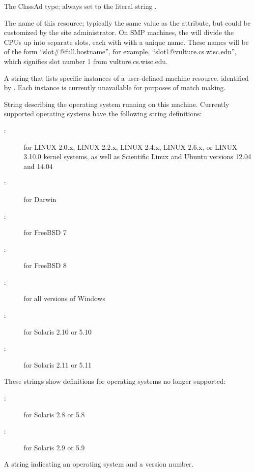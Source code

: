 \begin{description}
\item[\AdAttr{MyType}:] The ClassAd type; always set to the literal string .
%
\item[\AdAttr{Name}:] The name of this resource; typically the same value as
the  attribute, but could be customized by the site
administrator.
On SMP machines, the  will divide the CPUs up into separate
slots, each with with a unique name.
These names will be of the form ``slot\#@full.hostname'', for example,
``slot1@vulture.cs.wisc.edu'', which signifies slot number 1 from
vulture.cs.wisc.edu.
%
\label{OfflineName-machine-attribute}
\item[\AdAttr{Offline<name>}:] A string that lists specific
instances of a user-defined machine resource,
identified by . 
Each instance is currently unavailable for purposes of match making.
%
\label{OpSys-machine-attribute}
\item[\AdAttr{OpSys}:] String describing the operating system running on this
machine.  
Currently supported operating systems have the following string
definitions:
	\begin{description}
	\item[:] for LINUX 2.0.x, LINUX 2.2.x,
	LINUX 2.4.x, LINUX 2.6.x, or LINUX 3.10.0 kernel systems, as well as Scientific Linux 
        and Ubuntu versions 12.04 and 14.04
	\item[:] for Darwin
	\item[:] for FreeBSD 7
	\item[:] for FreeBSD 8
	\item[:] for all versions of Windows
	\item[:] for Solaris 2.10 or 5.10
	\item[:] for Solaris 2.11 or 5.11
	\end{description}
These strings show definitions for operating systems no longer supported:
	\begin{description}
	\item[:] for Solaris 2.8 or 5.8
	\item[:] for Solaris 2.9 or 5.9
	\end{description}
%
\item[\AdAttr{OpSysAndVer}:] A string indicating an operating system and
a version number.


\end{description}
